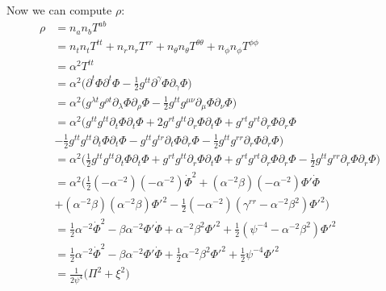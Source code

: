 \documentclass[12pt]{article}
\numberwithin{equation}{section}
\begin{document}
Now we can compute $\rho$:
\begin{equation}
\begin{aligned}
\rho &= n_a n_b T^{ab} \\
&= n_t n_t T^{tt} + n_r n_r T^{rr} + n_\theta n_\theta T^{\theta \theta} + n_\phi n_\phi T^{\phi \phi} \\
&= \alpha^{2} T^{tt} \\
&= \alpha^{2} \Big( \partial^t \Phi \partial^t \Phi - \frac{1}{2} g^{t t} \partial^\gamma \Phi \partial_\gamma \Phi \Big) \\
&= \alpha^{2} \Big( g^{\lambda t} g^{\rho t} \partial_\lambda \Phi \partial_\rho \Phi - \frac{1}{2} g^{t t} g^{\mu \nu} \partial_{\mu} \Phi \partial_{\nu} \Phi \Big) \\
&= \alpha^{2} \Big( g^{t t} g^{t t} \partial_t \Phi \partial_t \Phi + 2 g^{r t} g^{t t} \partial_r \Phi \partial_t \Phi + g^{r t} g^{r t} \partial_r \Phi \partial_r \Phi \\
&- \frac{1}{2} g^{t t} g^{t t} \partial_{t} \Phi \partial_{t} \Phi - g^{t t} g^{t r} \partial_{t} \Phi \partial_{r} \Phi - \frac{1}{2} g^{t t} g^{r r} \partial_{r} \Phi \partial_{r} \Phi \Big) \\
&= \alpha^{2} \Big( \frac{1}{2} g^{t t} g^{t t} \partial_t \Phi \partial_t \Phi + g^{r t} g^{t t} \partial_r \Phi \partial_t \Phi + g^{r t} g^{r t} \partial_r \Phi \partial_r \Phi - \frac{1}{2} g^{t t} g^{r r} \partial_{r} \Phi \partial_{r} \Phi \Big) \\
&= \alpha^{2} \Big( \frac{1}{2} (-\alpha^{-2}) (-\alpha^{-2}) \dot{\Phi}^2 + (\alpha^{-2} \beta) (-\alpha^{-2}) \Phi' \dot{\Phi} \\
&+ (\alpha^{-2} \beta) (\alpha^{-2} \beta) \Phi'^2 - \frac{1}{2} (-\alpha^{-2}) (\gamma^{rr} - \alpha^{-2} \beta^2) \Phi'^2 \Big) \\
&= \frac{1}{2} \alpha^{-2} \dot{\Phi}^2 - \beta \alpha^{-2} \Phi' \dot{\Phi} + \alpha^{-2} \beta^2 \Phi'^2 + \frac{1}{2} (\psi^{-4} - \alpha^{-2} \beta^2) \Phi'^2 \\
&= \frac{1}{2} \alpha^{-2} \dot{\Phi}^2 - \beta \alpha^{-2} \Phi' \dot{\Phi} + \frac{1}{2} \alpha^{-2} \beta^2 \Phi'^2 + \frac{1}{2} \psi^{-4} \Phi'^2 \\
&= \frac{1}{2 \psi^{4}} \Big( \Pi^2 + \xi^2 \Big) \\
\end{aligned}
\end{equation}
\end{document}
